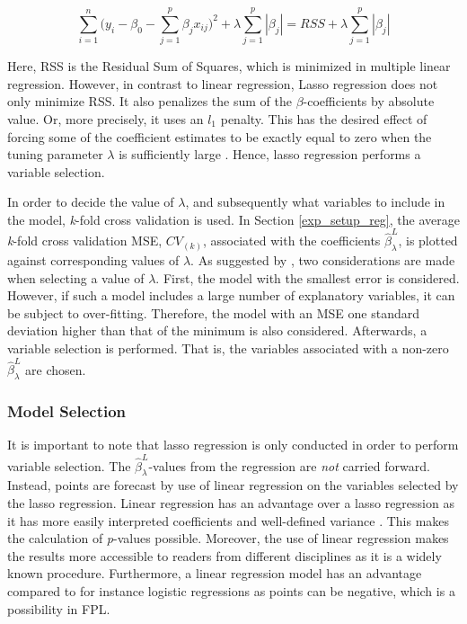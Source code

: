 \begin{equation}
    \sum_{i=1}^n\Big (y_i-\beta_0-\sum_{j=1}^p\beta_jx_{ij}\Big)^2 + \lambda \sum_{j=1}^p|\beta_j| = RSS + \lambda \sum_{j=1}^p|\beta_j|
    \label{eq:lasso}
\end{equation}

Here, RSS is the Residual Sum of Squares, which is minimized in multiple linear regression. However, in contrast to linear regression, Lasso regression does not only minimize RSS. It also penalizes the sum of the $\beta$-coefficients by absolute value. Or, more precisely, it uses an $l_1$ penalty. This has the desired effect of forcing some of the coefficient estimates to be exactly equal to zero when the tuning parameter $\lambda$ is sufficiently large \citep{ISLR}. Hence, lasso regression performs a variable selection.

\newpar 

In order to decide the value of $\lambda$, and subsequently what variables to include in the model, \textit{k}-fold cross validation is used. In Section \ref{exp_setup_reg}, the average \textit{k}-fold cross validation MSE, $CV_{(k)}$, associated with the coefficients $\hat{\beta}_{\lambda}^{L}$, is plotted against corresponding values of $\lambda$. As suggested by \cite{ISLR}, two considerations are made when selecting a value of $\lambda$. First, the model with the smallest error is considered. However, if such a model includes a large number of explanatory variables, it can be subject to over-fitting. Therefore, the model with an MSE one standard deviation higher than that of the minimum is also considered. Afterwards, a variable selection is performed. That is, the variables associated with a non-zero $\hat{\beta}_{\lambda}^{L}$ are chosen. 

\subsubsection{Model Selection}

It is important to note that lasso regression is only conducted in order to perform variable selection. The  $\hat{\beta}_{\lambda}^{L}$-values from the regression are \textit{not} carried forward. Instead, points are forecast by use of linear regression on the variables selected by the lasso regression. Linear regression has an advantage over a lasso regression as it has more easily interpreted coefficients and well-defined variance \citep{ISLR}. This makes the calculation of \textit{p}-values possible. Moreover, the use of linear regression makes the results more accessible to readers from different disciplines as it is a widely known procedure. Furthermore, a linear regression model has an advantage compared to for instance logistic regressions as points can be negative, which is a possibility in FPL.

